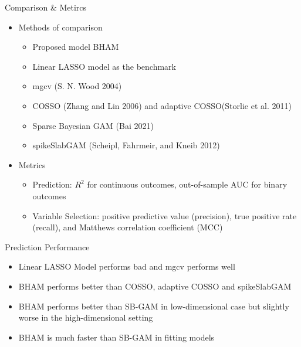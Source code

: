 \documentclass[
  ignorenonframetext,
  aspectratio=169]{beamer}
\providecommand{\tightlist}{%
  \setlength{\itemsep}{0pt}\setlength{\parskip}{0pt}}
\begin{document}
\begin{frame}{Comparison \& Metircs}
\protect\hypertarget{comparison-metircs}{}
\begin{itemize}
\tightlist
\item
  Methods of comparison

  \begin{itemize}
  \tightlist
  \item
    Proposed model BHAM
  \item
    Linear LASSO model as the benchmark
  \item
    mgcv (S. N. Wood 2004)
  \item
    COSSO (Zhang and Lin 2006) and adaptive COSSO(Storlie et al. 2011)
  \item
    Sparse Bayesian GAM (Bai 2021)
  \item
    spikeSlabGAM (Scheipl, Fahrmeir, and Kneib 2012)
  \end{itemize}
\item
  Metrics

  \begin{itemize}
  \tightlist
  \item
    Prediction: \(R^2\) for continuous outcomes, out-of-sample AUC for
    binary outcomes
  \item
    Variable Selection: positive predictive value (precision), true
    positive rate (recall), and Matthews correlation coefficient (MCC)
  \end{itemize}
\end{itemize}
\end{frame}

\begin{frame}{Prediction Performance}
\protect\hypertarget{prediction-performance}{}
\begin{itemize}
\tightlist
\item
  Linear LASSO Model performs bad and mgcv performs well
\item
  BHAM performs better than COSSO, adaptive COSSO and spikeSlabGAM
\item
  BHAM performs better than SB-GAM in low-dimensional case but slightly
  worse in the high-dimensional setting
\item
  BHAM is much faster than SB-GAM in fitting models
\end{itemize}
\end{frame}
\end{document}
